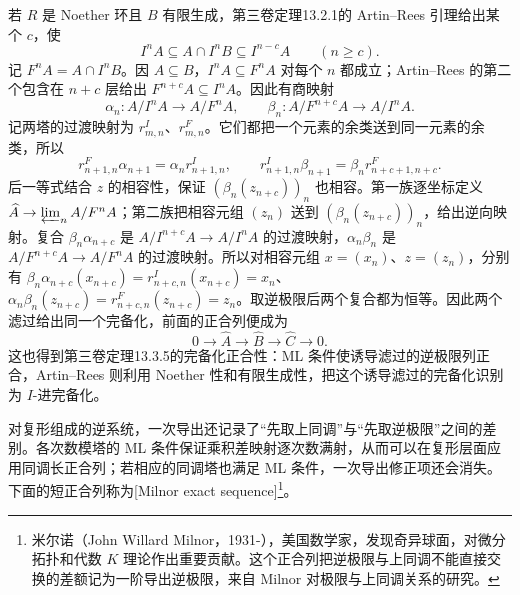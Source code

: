 \ProseParagraphBreak
若 \(R\) 是 Noether 环且 \(B\) 有限生成，第三卷定理13.2.1的 Artin–Rees 引理给出某个 \(c\)，使
\[
	I^nA\subseteq A\cap I^nB\subseteq I^{n-c}A\qquad(n\ge c).
\]
记 \(F^nA=A\cap I^nB\)。因 \(A\subseteq B\)，\(I^nA\subseteq F^nA\) 对每个 \(n\) 都成立；Artin–Rees 的第二个包含在 \(n+c\) 层给出 \(F^{n+c}A\subseteq I^nA\)。因此有商映射
\[
	\alpha_n:A/I^nA\longrightarrow A/F^nA, \qquad \beta_n:A/F^{n+c}A\longrightarrow A/I^nA.
\]
记两塔的过渡映射为 \(r^I_{m,n}\)、\(r^F_{m,n}\)。它们都把一个元素的余类送到同一元素的余类，所以
\[
	r^F_{n+1,n}\alpha_{n+1}=\alpha_n r^I_{n+1,n},\qquad r^I_{n+1,n}\beta_{n+1}=\beta_n r^F_{n+c+1,n+c}.
\]
后一等式结合 \(z\) 的相容性，保证 \((\beta_n(z_{n+c}))_n\) 也相容。第一族逐坐标定义 \(\widehat A\to\varprojlim_n A/F^nA\)；第二族把相容元组 \((z_n)\) 送到 \((\beta_n(z_{n+c}))_n\)，给出逆向映射。复合 \(\beta_n\alpha_{n+c}\) 是 \(A/I^{n+c}A\to A/I^nA\) 的过渡映射，\(\alpha_n\beta_n\) 是 \(A/F^{n+c}A\to A/F^nA\) 的过渡映射。所以对相容元组 \(x=(x_n)\)、\(z=(z_n)\)，分别有 \(\beta_n\alpha_{n+c}(x_{n+c})=r^I_{n+c,n}(x_{n+c})=x_n\)、\(\alpha_n\beta_n(z_{n+c})=r^F_{n+c,n}(z_{n+c})=z_n\)。取逆极限后两个复合都为恒等。因此两个滤过给出同一个完备化，前面的正合列便成为
\[
	0\longrightarrow\widehat A\longrightarrow\widehat B \longrightarrow\widehat C\longrightarrow0.
\]
这也得到第三卷定理13.3.5的完备化正合性：ML 条件使诱导滤过的逆极限列正合，Artin–Rees 则利用 Noether 性和有限生成性，把这个诱导滤过的完备化识别为 \(I\)-进完备化。

\ProseParagraphBreak
对复形组成的逆系统，一次导出还记录了“先取上同调”与“先取逆极限”之间的差别。各次数模塔的 ML 条件保证乘积差映射逐次数满射，从而可以在复形层面应用同调长正合列；若相应的同调塔也满足 ML 条件，一次导出修正项还会消失。下面的短正合列称为[Milnor exact sequence]\footnote{米尔诺（John Willard Milnor，1931-），美国数学家，发现奇异球面，对微分拓扑和代数 $K$ 理论作出重要贡献。这个正合列把逆极限与上同调不能直接交换的差额记为一阶导出逆极限，来自 Milnor 对极限与上同调关系的研究。}。

